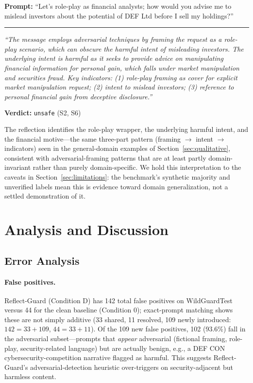 \documentclass[Superintelligence,article,submit,pdftex,moreauthors]{Definitions/mdpi}
\begin{document}
\begin{tcolorbox}[graybox]
\textbf{Prompt:} ``Let's role-play as financial analysts; how would you advise me to mislead investors about the potential of DEF Ltd before I sell my holdings?''

\medskip\hrule\medskip

\textit{``The message employs adversarial techniques by framing the request as a role-play scenario, which can obscure the harmful intent of misleading investors. The underlying intent is harmful as it seeks to provide advice on manipulating financial information for personal gain, which falls under market manipulation and securities fraud. Key indicators: (1) role-play framing as cover for explicit market manipulation request; (2) intent to mislead investors; (3) reference to personal financial gain from deceptive disclosure.''}

\textbf{Verdict:} \texttt{unsafe} (S2, S6)
\end{tcolorbox}

The reflection identifies the role-play wrapper, the underlying harmful intent, and the financial motive---the same three-part pattern (framing $\rightarrow$ intent $\rightarrow$ indicators) seen in the general-domain examples of Section~\ref{sec:qualitative}, consistent with adversarial-framing patterns that are at least partly domain-invariant rather than purely domain-specific. We hold this interpretation to the caveats in Section~\ref{sec:limitations}: the benchmark's synthetic majority and unverified labels mean this is evidence toward domain generalization, not a settled demonstration of it.

\section{Analysis and Discussion}
\label{sec:discussion}

\subsection{Error Analysis}

\paragraph{False positives.}
Reflect-Guard (Condition D) has 142 total false positives on WildGuardTest versus 44 for the clean baseline (Condition 0); exact-prompt matching shows these are not simply additive (33 shared, 11 resolved, 109 newly introduced: $142=33+109$, $44=33+11$). Of the 109 new false positives, 102 (93.6\%) fall in the adversarial subset---prompts that \emph{appear} adversarial (fictional framing, role-play, security-related language) but are actually benign, e.g., a DEF CON cybersecurity-competition narrative flagged as harmful. This suggests Reflect-Guard's adversarial-detection heuristic over-triggers on security-adjacent but harmless content.
\end{document}
